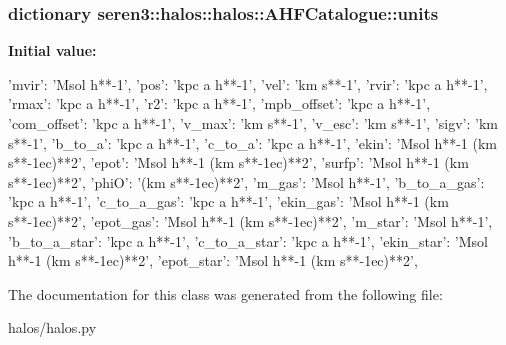 \hypertarget{classseren3_1_1halos_1_1halos_1_1AHFCatalogue_ab64f313e31abdcaf81ddabb9758d65a9}{
\subsubsection[{units}]{\setlength{\rightskip}{0pt plus 5cm}dictionary seren3::halos::halos::AHFCatalogue::units}}
\label{classseren3_1_1halos_1_1halos_1_1AHFCatalogue_ab64f313e31abdcaf81ddabb9758d65a9}
{\bfseries Initial value:}
\begin{DoxyCode}
{'mvir': 'Msol h**-1',
             'pos': 'kpc a h**-1',
             'vel': 'km s**-1',
             'rvir': 'kpc a h**-1',
             'rmax': 'kpc a h**-1',
             'r2': 'kpc a h**-1',
             'mpb_offset': 'kpc a h**-1',
             'com_offset': 'kpc a h**-1',
             'v_max': 'km s**-1',
             'v_esc': 'km s**-1',
             'sigv': 'km s**-1',
             'b_to_a': 'kpc a h**-1',
             'c_to_a': 'kpc a h**-1',
             'ekin': 'Msol h**-1 (km s**-1ec)**2',
             'epot': 'Msol h**-1 (km s**-1ec)**2',
             'surfp': 'Msol h**-1 (km s**-1ec)**2',
             'phiO': '(km s**-1ec)**2',
             'm_gas': 'Msol h**-1',
             'b_to_a_gas': 'kpc a h**-1',
             'c_to_a_gas': 'kpc a h**-1',
             'ekin_gas': 'Msol h**-1 (km s**-1ec)**2',
             'epot_gas': 'Msol h**-1 (km s**-1ec)**2',
             'm_star': 'Msol h**-1',
             'b_to_a_star': 'kpc a h**-1',
             'c_to_a_star': 'kpc a h**-1',
             'ekin_star': 'Msol h**-1 (km s**-1ec)**2',
             'epot_star': 'Msol h**-1 (km s**-1ec)**2',
             }
\end{DoxyCode}


The documentation for this class was generated from the following file:\begin{DoxyCompactItemize}
\item 
halos/halos.py\end{DoxyCompactItemize}
